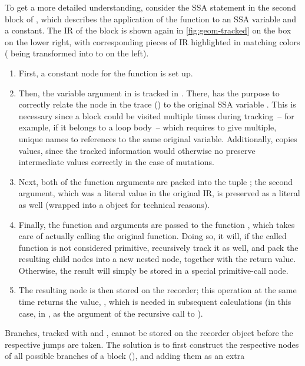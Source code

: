 To get a more detailed understanding, consider the SSA statement  in the second
block of , which describes the application of the function \jlinl{+} to an SSA variable
and a constant.  The IR of the block is shown again in \ref{fig:geom-tracked} on the box on the
lower right, with corresponding pieces of IR highlighted in matching colors ( being
transformed into  to  on the left).
\begin{enumerate}
  \firmlist
\item First, a constant node  for the function is set up.
\item Then, the variable argument in is tracked in .  There,  has
  the purpose to correctly relate the node in the trace () to the original SSA variable
  .  This is necessary since a block could be visited multiple times during tracking~--
  for example, if it belongs to a loop body~-- which requires to give multiple, unique names to
  references to the same original variable.  Additionally,  copies values,
  since the tracked information would otherwise no preserve intermediate values correctly in the
  case of mutations.
\item Next, both of the function arguments are packed into the tuple ; the second
  argument, which was a literal value  in the original IR, is preserved as a literal as
  well (wrapped into a  object for technical reasons).
\item Finally, the function and arguments are passed to the function , which
  takes care of actually calling the original function.  Doing so, it will, if the called function is
  not considered primitive, recursively track it as well, and pack the resulting child nodes into a
  new nested node, together with the return value.  Otherwise, the result will simply be stored in a
  special primitive-call node.
\item The resulting node is then stored on the recorder; this operation at the same time returns the
  value, , which is needed in subsequent calculations (in this case, in , as
  the argument of the recursive call to ).
\end{enumerate}
Branches, tracked with  and , cannot be stored on the
recorder object before the respective jumps are taken.  The solution is to first construct the
respective nodes of all possible branches of a block (), and adding them as an extra
